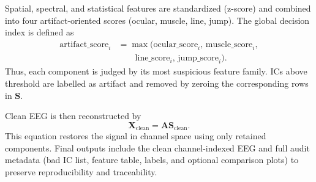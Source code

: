 Spatial, spectral, and statistical features are standardized (z-score) and combined into four artifact-oriented scores (ocular, muscle, line, jump). The global decision index is defined as
\[
\begin{aligned}
\mathrm{artifact\_score}_i
&=
\max\!\big(
\mathrm{ocular\_score}_i,\,
\mathrm{muscle\_score}_i,\\
&\qquad
\mathrm{line\_score}_i,\,
\mathrm{jump\_score}_i
\big).
\end{aligned}
\]
Thus, each component is judged by its most suspicious feature family. ICs above threshold are labelled as artifact and removed by zeroing the corresponding rows in $\mathbf{S}$.

Clean EEG is then reconstructed by
\[
\mathbf{X}_{\text{clean}}=\mathbf{A}\mathbf{S}_{\text{clean}}.
\]
This equation restores the signal in channel space using only retained components. Final outputs include the clean channel-indexed EEG and full audit metadata (bad IC list, feature table, labels, and optional comparison plots) to preserve reproducibility and traceability.


